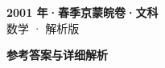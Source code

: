 \documentclass[zihao=-4, a4paper]{ctexart}
\begin{document}
\begin{center}
  {\Large\bfseries 2001 年·春季京蒙皖卷·文科}\\[4pt]
  {\large 数学 · 解析版}
\end{center}
\medskip
{}

\clearpage
{}
\begin{center}{\Large\bfseries 参考答案与详细解析}\end{center}
\medskip

\end{document}
